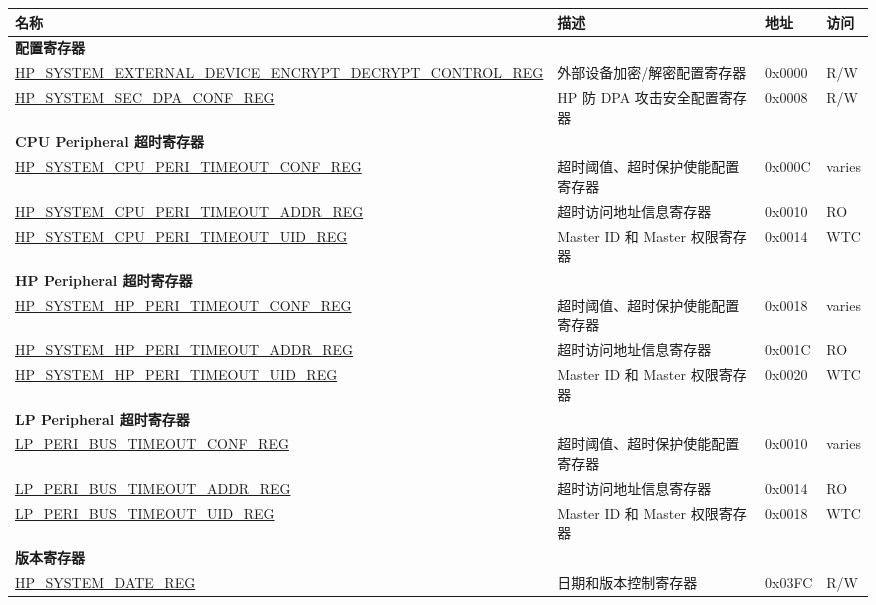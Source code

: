 \begin{longtable}{ | p{12cm} | p{7.2cm} | p{1.3cm} | p{1cm} | }
\hline\rowcolor{lightgray}
名称 & 描述 &  地址 & 访问 \\ \hline
\endhead
\multicolumn{4}{|l|}{\textbf{配置寄存器}} \\ \hline
\hyperref[regdesc:HPSYSTEMEXTERNALDEVICEENCRYPTDECRYPTCONTROLREG]{HP\_SYSTEM\_EXTERNAL\_DEVICE\_ENCRYPT\_DECRYPT\_CONTROL\_REG} & 外部设备加密/解密配置寄存器 & 0x0000 & R/W \\ \hline
\hyperref[regdesc:HPSYSTEMSECDPACONFREG]{HP\_SYSTEM\_SEC\_DPA\_CONF\_REG} & HP 防 DPA 攻击安全配置寄存器 & 0x0008 & R/W \\ \hline
\multicolumn{4}{|l|}{\textbf{CPU Peripheral 超时寄存器}} \\ \hline
\hyperref[regdesc:HPSYSTEMCPUPERITIMEOUTCONFREG]{HP\_SYSTEM\_CPU\_PERI\_TIMEOUT\_CONF\_REG} & 超时阈值、超时保护使能配置寄存器 & 0x000C & varies \\ \hline
\hyperref[regdesc:HPSYSTEMCPUPERITIMEOUTADDRREG]{HP\_SYSTEM\_CPU\_PERI\_TIMEOUT\_ADDR\_REG} & 超时访问地址信息寄存器 & 0x0010 & RO \\ \hline
\hyperref[regdesc:HPSYSTEMCPUPERITIMEOUTUIDREG]{HP\_SYSTEM\_CPU\_PERI\_TIMEOUT\_UID\_REG} & Master ID 和 Master 权限寄存器 & 0x0014 & WTC \\ \hline
\multicolumn{4}{|l|}{\textbf{HP Peripheral 超时寄存器}} \\ \hline
\hyperref[regdesc:HPSYSTEMHPPERITIMEOUTCONFREG]{HP\_SYSTEM\_HP\_PERI\_TIMEOUT\_CONF\_REG} & 超时阈值、超时保护使能配置寄存器 & 0x0018 & varies \\ \hline
\hyperref[regdesc:HPSYSTEMHPPERITIMEOUTADDRREG]{HP\_SYSTEM\_HP\_PERI\_TIMEOUT\_ADDR\_REG} & 超时访问地址信息寄存器 & 0x001C & RO \\ \hline
\hyperref[regdesc:HPSYSTEMHPPERITIMEOUTUIDREG]{HP\_SYSTEM\_HP\_PERI\_TIMEOUT\_UID\_REG} & Master ID 和 Master 权限寄存器 & 0x0020 & WTC \\ \hline
\multicolumn{4}{|l|}{\textbf{LP Peripheral 超时寄存器}} \\ \hline
\hyperref[regdesc:LPPERIBUSTIMEOUTCONFREG]{LP\_PERI\_BUS\_TIMEOUT\_CONF\_REG} & 超时阈值、超时保护使能配置寄存器 & 0x0010 & varies \\ \hline
\hyperref[regdesc:LPPERIBUSTIMEOUTADDRREG]{LP\_PERI\_BUS\_TIMEOUT\_ADDR\_REG} & 超时访问地址信息寄存器 & 0x0014 & RO \\ \hline
\hyperref[regdesc:LPPERIBUSTIMEOUTUIDREG]{LP\_PERI\_BUS\_TIMEOUT\_UID\_REG} & Master ID 和 Master 权限寄存器 & 0x0018 & WTC \\ \hline
\multicolumn{4}{|l|}{\textbf{版本寄存器}} \\ \hline
\hyperref[regdesc:HPSYSTEMDATEREG]{HP\_SYSTEM\_DATE\_REG} & 日期和版本控制寄存器 & 0x03FC & R/W \\ \hline
\end{longtable}
